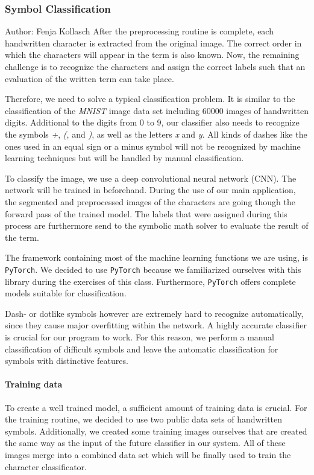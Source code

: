 \documentclass[12pt]{article}
\begin{document}
\subsubsection{Symbol Classification}
\small{Author: Fenja Kollasch} \newline \newline
After the preprocessing routine is complete, each handwritten character is extracted from the original image. The correct order in which the characters will appear in the term is also known. Now, the remaining challenge is to recognize the characters and assign the correct labels such that an evaluation of the written term can take place.
	
	Therefore, we need to solve a typical classification problem. It is similar to the classification of the \textit{MNIST} image data set including 60000 images of handwritten digits. Additional to the digits from 0 to 9, our classifier also needs to recognize the symbols \textit{+}, \textit{(}, and \textit{)}, as well as the letters \textit{x} and \textit{y}. All kinds of dashes like the ones used in an equal sign or a minus symbol will not be recognized by machine learning techniques but will be handled by manual classification.
	
	To classify the image, we use a deep convolutional neural network (CNN). The network will be trained in beforehand. During the use of our main application, the segmented and preprocessed images of the characters are going though the forward pass of the trained model. The labels that were assigned during this process are furthermore send to the symbolic math solver to evaluate the result of the term. 
	
	The framework containing most of the machine learning functions we are using, is \texttt{PyTorch}. We decided to use \texttt{PyTorch} because we familiarized ourselves with this library during the exercises of this class. Furthermore, \texttt{PyTorch} offers complete models suitable for classification.
		
	Dash- or dotlike symbols however are extremely hard to recognize automatically, since they cause major overfitting within the network. A highly accurate classifier is crucial for our program to work. For this reason, we perform a manual classification of difficult symbols and leave the automatic classification for symbols with distinctive features.
	
	\paragraph{Training data}
		To create a well trained model, a sufficient amount of training data is crucial. For the training routine, we decided to use two public data sets of handwritten symbols. Additionally, we created some training images ourselves that are created the same way as the input of the future classifier in our system. All of these images merge into a combined data set which will be finally used to train the character classificator.
		
\end{document}
